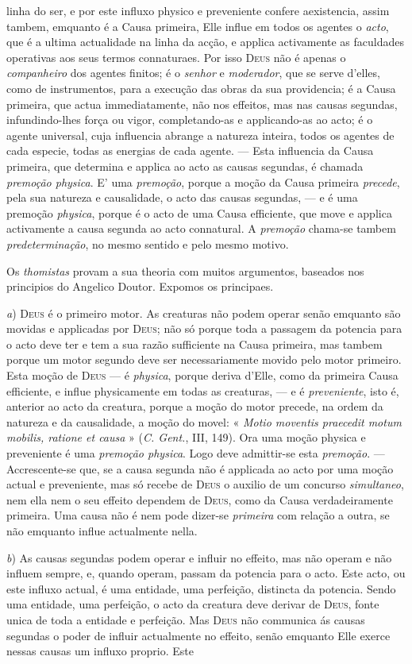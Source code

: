 linha do ser, e por este influxo physico e preveniente confere aexistencia, assim tambem, emquanto é a Causa primeira, Elle influe em todos os agentes o \emph{acto}, que é a ultima actualidade na linha da acção, e applica activamente as faculdades operativas aos seus termos connaturaes. Por isso \textsc{Deus} não é apenas o \emph{companheiro} dos agentes finitos; é o \emph{senhor} e \emph{moderador}, que se serve d'elles, como de instrumentos, para a execução das obras da sua providencia; é a Causa primeira, que actua immediatamente, não nos effeitos, mas nas causas segundas, infundindo-lhes força ou vigor, completando-as e applicando-as ao acto; é o agente universal, cuja influencia abrange a natureza inteira, todos os agentes de cada especie, todas as energias de cada agente. --- Esta influencia da Causa primeira, que determina e applica ao acto as causas segundas, é chamada \emph{premoção physica}. E' uma \emph{premoção}, porque a moção da Causa primeira \emph{precede}, pela sua natureza e causalidade, o acto das causas segundas, --- e é uma premoção \emph{physica}, porque é o acto de uma Causa efficiente, que move e applica activamente a causa segunda ao acto connatural. A \emph{premoção} chama-se tambem \emph{predeterminação}, no mesmo sentido e pelo mesmo motivo.\par Os \emph{thomistas} provam a sua theoria com muitos argumentos, baseados nos principios do Angelico Doutor. Expomos os principaes.\par \emph{a}) \textsc{Deus} é o primeiro motor. As creaturas não podem operar senão emquanto são movidas e applicadas por \textsc{Deus}; não só porque toda a passagem da potencia para o acto deve ter e tem a sua razão sufficiente na Causa primeira, mas tambem porque um motor segundo deve ser necessariamente movido pelo motor primeiro. Esta moção de \textsc{Deus} --- é \emph{physica}, porque deriva d'Elle, como da primeira Causa efficiente, e influe physicamente em todas as creaturas, --- e é \emph{preveniente}, isto é, anterior ao acto da creatura, porque a moção do motor precede, na ordem da natureza e da causalidade, a moção do movel: « \emph{Motio moventis praecedit motum mobilis, ratione et causa} » (\emph{C. Gent.}, III, 149). Ora uma moção physica e preveniente é uma \emph{premoção physica}. Logo deve admittir-se esta \emph{premoção}. --- Accrescente-se que, se a causa segunda não é applicada ao acto por uma moção actual e preveniente, mas só recebe de \textsc{Deus} o auxilio de um concurso \emph{simultaneo}, nem ella nem o seu effeito dependem de \textsc{Deus}, como da Causa verdadeiramente primeira. Uma causa não é nem pode dizer-se \emph{primeira} com relação a outra, se não emquanto influe actualmente nella.\par \emph{b}) As causas segundas podem operar e influir no effeito, mas não operam e não influem sempre, e, quando operam, passam da potencia para o acto. Este acto, ou este influxo actual, é uma entidade, uma perfeição, distincta da potencia. Sendo uma entidade, uma perfeição, o acto da creatura deve derivar de \textsc{Deus}, fonte unica de toda a entidade e perfeição. Mas \textsc{Deus} não communica ás causas segundas o poder de influir actualmente no effeito, senão emquanto Elle exerce nessas causas um influxo proprio. Este 